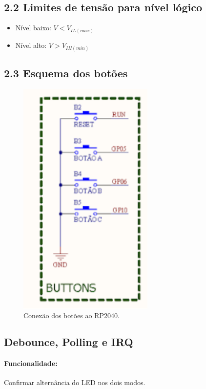 \documentclass{article}
\begin{document}
\subsection{2.2 Limites de tensão para nível lógico}
\begin{itemize}
    \item Nível baixo: $V < V_{IL(max)}$
    \item Nível alto: $V > V_{IH(min)}$
\end{itemize}

\subsection{2.3 Esquema dos botões}
\begin{figure}[H]
    \centering
    \includegraphics[width=0.6\textwidth]{circuito_botoes.png}
    \caption{Conexão dos botões ao RP2040.}
\end{figure}

\subsection{Debounce, Polling e IRQ}
\paragraph{Funcionalidade:} Confirmar alternância do LED nos dois modos.  
\end{document}
